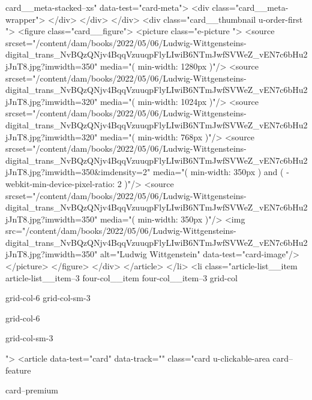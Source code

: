 {{{						
						card__meta-stacked--xs" data-test="card-meta">
<div class="card__meta-wrapper">
</div>
</div>
</div>
<div class="card__thumbnail u-order-first ">
<figure class="card__figure">
<picture class="e-picture   ">
<source srcset="/content/dam/books/2022/05/06/Ludwig-Wittgensteins-digital_trans_NvBQzQNjv4BqqVzuuqpFlyLIwiB6NTmJwfSVWeZ_vEN7c6bHu2jJnT8.jpg?imwidth=350" media="( min-width: 1280px )"/>
<source srcset="/content/dam/books/2022/05/06/Ludwig-Wittgensteins-digital_trans_NvBQzQNjv4BqqVzuuqpFlyLIwiB6NTmJwfSVWeZ_vEN7c6bHu2jJnT8.jpg?imwidth=320" media="( min-width: 1024px )"/>
<source srcset="/content/dam/books/2022/05/06/Ludwig-Wittgensteins-digital_trans_NvBQzQNjv4BqqVzuuqpFlyLIwiB6NTmJwfSVWeZ_vEN7c6bHu2jJnT8.jpg?imwidth=320" media="( min-width: 768px )"/>
<source srcset="/content/dam/books/2022/05/06/Ludwig-Wittgensteins-digital_trans_NvBQzQNjv4BqqVzuuqpFlyLIwiB6NTmJwfSVWeZ_vEN7c6bHu2jJnT8.jpg?imwidth=350&imdensity=2" media="( min-width: 350px ) and ( -webkit-min-device-pixel-ratio: 2 )"/>
<source srcset="/content/dam/books/2022/05/06/Ludwig-Wittgensteins-digital_trans_NvBQzQNjv4BqqVzuuqpFlyLIwiB6NTmJwfSVWeZ_vEN7c6bHu2jJnT8.jpg?imwidth=350" media="( min-width: 350px )"/>
<img src="/content/dam/books/2022/05/06/Ludwig-Wittgensteins-digital_trans_NvBQzQNjv4BqqVzuuqpFlyLIwiB6NTmJwfSVWeZ_vEN7c6bHu2jJnT8.jpg?imwidth=350" alt="Ludwig Wittgenstein" data-test="card-image"/>
</picture>
</figure>
</div>
</article>
</li>
<li class="article-list__item article-list__item--3 four-col__item four-col__item--3
			grid-col
			
			
			grid-col-6 grid-col-sm-3
			
			grid-col-6
			
			
			
			
			
			grid-col-sm-3
			
			
			
			
			
			
			
			
			">
<article data-test="card" data-track="" class="card
			u-clickable-area
			card--feature
			
			card--premium
			
			
			
			
			
}}}
